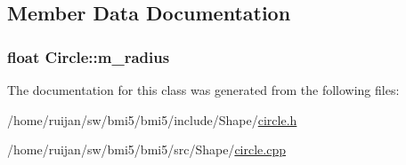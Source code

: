 \subsection{Member Data Documentation}
\hypertarget{classCircle_acbb9f46cef6c9deba7aa4e704bdc774f}{
\subsubsection[{m\-\_\-radius}]{\setlength{\rightskip}{0pt plus 5cm}float Circle\-::m\-\_\-radius\hspace{0.3cm}{\ttfamily [private]}}}\label{classCircle_acbb9f46cef6c9deba7aa4e704bdc774f}


The documentation for this class was generated from the following files\-:\begin{DoxyCompactItemize}
\item 
/home/ruijan/sw/bmi5/bmi5/include/\-Shape/\hyperlink{circle_8h}{circle.\-h}\item 
/home/ruijan/sw/bmi5/bmi5/src/\-Shape/\hyperlink{circle_8cpp}{circle.\-cpp}\end{DoxyCompactItemize}
